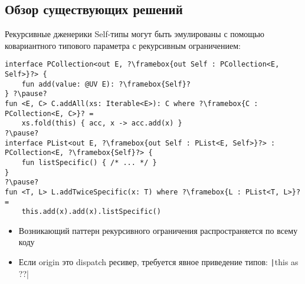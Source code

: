 \documentclass[handout,aspectratio=169,usenames,dvipsnames]{beamer}
\begin{document}
\subsection{Обзор существующих решений}

\begin{frame}[fragile]{Рекурсивные дженерики}
    Self-типы могут быть эмулированы с помощью ковариантного типового параметра с рекурсивным ограничением:
    \begin{verbatim}
interface PCollection<out E, ?\framebox{out Self : PCollection<E, Self>}?> {
    fun add(value: @UV E): ?\framebox{Self}?
} ?\pause?
fun <E, C> C.addAll(xs: Iterable<E>): C where ?\framebox{C : PCollection<E, C>}? =
    xs.fold(this) { acc, x -> acc.add(x) }
?\pause?
interface PList<out E, ?\framebox{out Self : PList<E, Self>}?> : PCollection<E, ?\framebox{Self}?> {
    fun listSpecific() { /* ... */ }
}
?\pause?
fun <T, L> L.addTwiceSpecific(x: T) where ?\framebox{L : PList<T, L>}? =
    this.add(x).add(x).listSpecific()
    \end{verbatim}
    \begin{itemize}
        \item Возникающий паттерн рекурсивного ограничения распространяется по всему коду
        \item Если origin это dispatch ресивер, требуется явное приведение типов: \texttt|this as ??|
    \end{itemize}
\end{frame}
\end{document}

